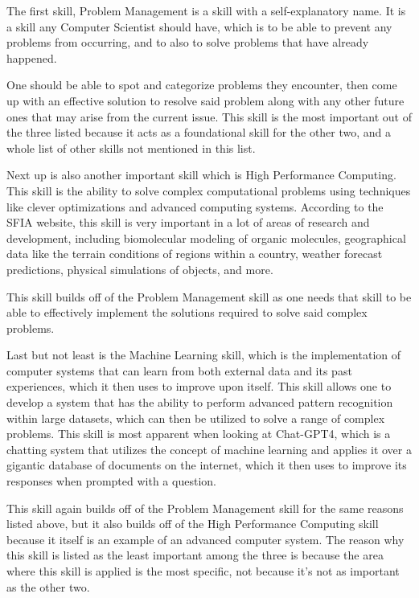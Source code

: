 \documentclass[a4paper, 11pt]{report}
\begin{document}
The first skill, Problem Management is a skill with a self-explanatory name. It is a skill any Computer Scientist should have, which is to be able to prevent any problems from occurring, and to also to solve problems that have already happened. 

One should be able to spot and categorize problems they encounter, then come up with an effective solution to resolve said problem along with any other future ones that may arise from the current issue. This skill is the most important out of the three listed because it acts as a foundational skill for the other two, and a whole list of other skills not mentioned in this list.


Next up is also another important skill which is High Performance Computing. This skill is the ability to solve complex computational problems using techniques like clever optimizations and advanced computing systems. According to the SFIA website, this skill is very important in a lot of areas of research and development, including biomolecular modeling of organic molecules, geographical data like the terrain conditions of regions within a country, weather forecast predictions, physical simulations of objects, and more.

This skill builds off of the Problem Management skill as one needs that skill to be able to effectively implement the solutions required to solve said complex problems.

Last but not least is the Machine Learning skill, which is the implementation of computer systems that can learn from both external data and its past experiences, which it then uses to improve upon itself. This skill allows one to develop a system that has the ability to perform advanced pattern recognition within large datasets, which can then be utilized to solve a range of complex problems. This skill is most apparent when looking at Chat-GPT4, which is a chatting system that utilizes the concept of machine learning and applies it over a gigantic database of documents on the internet, which it then uses to improve its responses when prompted with a question. 

This skill again builds off of the Problem Management skill for the same reasons listed above, but it also builds off of the High Performance Computing skill because it itself is an example of an advanced computer system. The reason why this skill is listed as the least important among the three is because the area where this skill is applied is the most specific, not because it’s not as important as the other two.
\end{document}
